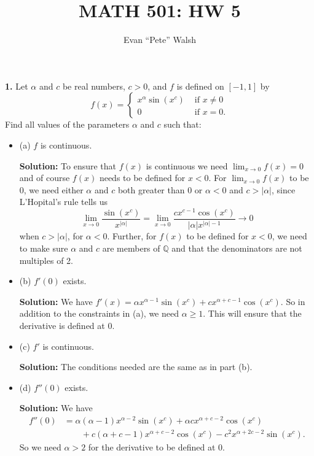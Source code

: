 \documentclass[11pt]{article}
\title{MATH 501: HW 5}
\author{Evan ``Pete'' Walsh}
\begin{document}
\maketitle

{\bf 1.} Let $\alpha$ and $c$ be real numbers, $c > 0$, and $f$ is
defined on $[-1,1]$ by 
\[ f(x) = \left\{ \begin{array}{cl}
    x^{\alpha}\sin(x^{c}) & \text{ if } x \neq 0 \\
  0 & \text{ if } x = 0. \end{array} \right. \]
Find all values of the parameters $\alpha$ and $c$ such that:
\begin{itemize}[label={},leftmargin=4mm, itemsep=1em, parsep=1em]
  \item (a) $f$ is continuous. 

    {\bf Solution:} To ensure that $f(x)$ is continuous we need $\lim_{x\rightarrow 0}f(x) = 0$
    and of course $f(x)$ needs to be defined for $x < 0$. For
    $\lim_{x\rightarrow 0}f(x)$ to be 0, we need either $\alpha$ and $c$ both
    greater than 0 or $\alpha < 0$ and $c > |\alpha|$, since L'Hopital's rule
    tells us 
    \[ \lim_{x\rightarrow 0}\frac{\sin(x^{c})}{x^{|\alpha|}} =
      \lim_{x\rightarrow 0} \frac{cx^{c-1}\cos(x^{c})}{|\alpha|x^{|\alpha|-1}}
    \rightarrow 0 \]
    when $c > |\alpha|$, for $\alpha < 0$. Further, for $f(x)$ to be defined for
    $x < 0$, we need to make sure $\alpha$ and $c$ are members of $\mathbb{Q}$
    and that the denominators are not multiples of 2.

  \item (b) $f'(0)$ exists. 

    {\bf Solution:} We have $f'(x) = \alpha x^{\alpha - 1}\sin(x^{c}) +
    cx^{\alpha + c - 1}\cos(x^{c})$. So in addition to the constraints in (a),
    we need $\alpha \geq 1$. This will ensure that the derivative is defined at
    0.

  \item (c) $f'$ is continuous.

    {\bf Solution:} The conditions needed are the same as in part (b).

  \item (d) $f''(0)$ exists.

    {\bf Solution:} We have 
    \begin{align*}
      f''(0) & = \alpha(\alpha-1)x^{\alpha-2}\sin(x^{c}) + \alpha c x^{\alpha +
      c - 2}\cos(x^{c}) \\
      & \qquad + c(\alpha + c - 1)x^{\alpha + c - 2}\cos(x^{c}) - c^{2}x^{\alpha + 2c -
      2}\sin(x^{c}). 
    \end{align*}
    So we need $\alpha > 2$ for the derivative to be defined at 0.
\end{itemize}
\end{document}
